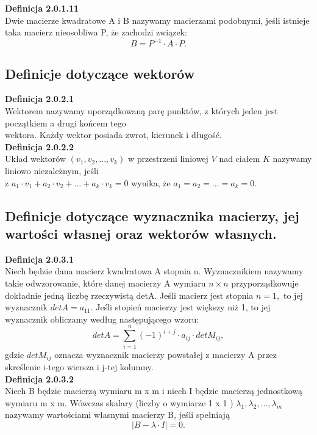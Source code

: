 \documentclass[10pt,a4paper]{report}
\begin{document}
\noindent \textbf{Definicja 2.0.1.11}\\
\noindent Dwie macierze kwadratowe A i B nazywamy macierzami podobnymi, jeśli istnieje taka macierz nieosobliwa P, że zachodzi związek: $$ B=P^{-1}\cdot A\cdot P. $$


\subsection{Definicje dotyczące wektorów} 

\noindent \textbf{Definicja 2.0.2.1}\\
\noindent Wektorem nazywamy uporządkowaną parę punktów, z których jeden jest początkiem a drugi końcem tego\\ wektora. Każdy wektor posiada zwrot, kierunek i długość.\\

\noindent \textbf{Definicja 2.0.2.2}\\
\noindent Układ wektorów  $ (v_{1}, v_{2}, ..., v_{k}) $ w przestrzeni liniowej $ V $ nad ciałem $ K $ nazywamy liniowo niezależnym, jeśli\\ z $ a_{1}\cdot v_{1}+ a_{2}\cdot v_{2} + ... + a_{k}\cdot v_{k} = 0 $ wynika, że $a_{1}=a_{2}=...=a_{k}=0 $.\\

\subsection{Definicje dotyczące wyznacznika macierzy, jej wartości własnej oraz wektorów własnych.}

\noindent \textbf{Definicja 2.0.3.1}\\
\noindent Niech będzie dana macierz kwadratowa A stopnia n. Wyznacznikiem nazywamy takie odwzorowanie, które danej macierzy A wymiaru $n \times n$ przyporządkowuje dokładnie jedną liczbę rzeczywistą detA. Jeśli macierz jest stopnia $n = 1, $ to jej wyznacznik $detA = a_{11}$. 
Jeśli stopień macierzy jest większy niż 1, to jej wyznacznik obliczamy według następującego wzoru: 
$$
detA = \sum_{i=1}^{n} (-1)^{i+j}\cdot a_{ij}\cdot detM_{ij},
$$
gdzie $detM_{ij}$ oznacza wyznacznik macierzy powstałej z macierzy A przez skreślenie i-tego wiersza i j-tej kolumny.\\
\newpage
\noindent \textbf{Definicja 2.0.3.2}\\
\noindent Niech B będzie macierzą wymiaru m x m i niech I będzie macierzą jednostkową wymiaru m x m. Wówczas skalary (liczby o wymiarze 1 x 1 ) $\lambda_{1}, \lambda_{2}, ..., \lambda_{m} $ nazywamy wartościami własnymi macierzy B, jeśli spełniają $$|B-\lambda\cdot I|=0. $$ \\
\end{document}
